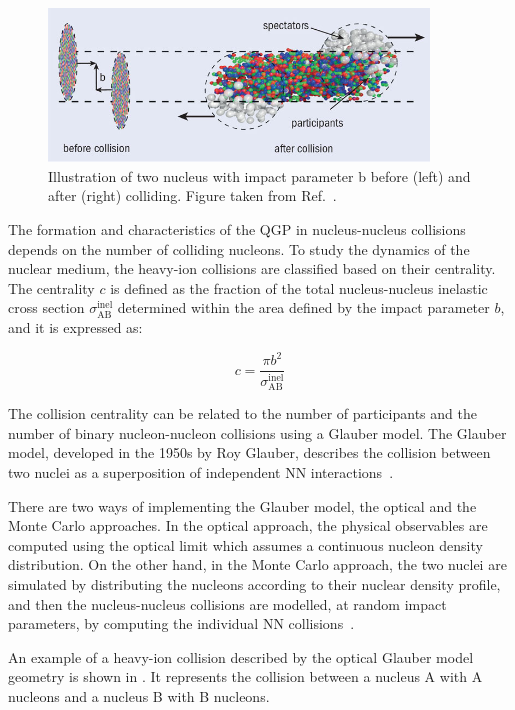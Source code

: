 \begin{figure}[!htb]
 \centering
 \includegraphics[width=0.9\textwidth]{Figures/Introduction/HeavyIons/CollisionGeometry.jpg}
 \caption{Illustration of two nucleus with impact parameter b before (left) and after (right) colliding. Figure taken from Ref.~\cite{QCDPhaseDiagram}.}
 \label{fig:CollisionGeometry}
\end{figure}

The formation and characteristics of the QGP in nucleus-nucleus collisions depends on the number of colliding nucleons. To study the dynamics of the nuclear medium, the heavy-ion collisions are classified based on their centrality. The centrality $c$ is defined as the fraction of the total nucleus-nucleus inelastic cross section $\sigma^{\text{inel}}_{\text{AB}}$ determined within the area defined by the impact parameter $b$, and it is  expressed as:

\begin{equation}
 c = \frac{{\pi}b^{2}}{\sigma^{\text{inel}}_{\text{AB}}}
\end{equation}

The collision centrality can be related to the number of participants \npart and the number of binary nucleon-nucleon collisions \ncoll using a Glauber model. The Glauber model, developed in the 1950s by Roy Glauber, describes the collision between two nuclei as a superposition of independent NN interactions~\cite{GlauberModel}.

There are two ways of implementing the Glauber model, the optical and the Monte Carlo approaches. In the optical approach, the physical observables are computed using the optical limit which assumes a continuous nucleon density distribution. On the other hand, in the Monte Carlo approach, the two nuclei are simulated by distributing the nucleons according to their nuclear density profile, and then the nucleus-nucleus collisions are modelled, at random impact parameters, by computing the individual NN collisions~\cite{GlauberModel}.

An example of a heavy-ion collision described by the optical Glauber model geometry is shown in . It represents the collision between a nucleus A with A nucleons and a nucleus B with B nucleons.

